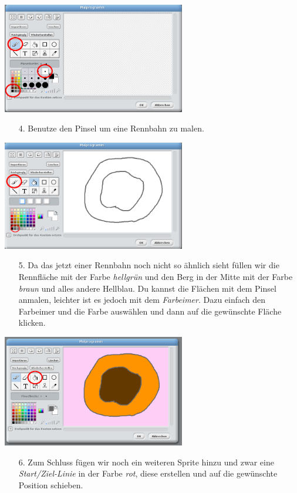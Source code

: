 \includegraphics[width=0.6\textwidth]{images/aufgabe4_rennbahn_pinsel_waehlen.png}
\begin{itemize}
\item[4. ] Benutze den Pinsel um eine Rennbahn zu malen.
\end{itemize}
\includegraphics[width=0.6\textwidth]{images/aufgabe4_rennbahn_malen_00.png}
\begin{itemize}
\item[5. ] Da das jetzt einer Rennbahn noch nicht so {\"a}hnlich sieht f{\"u}llen wir die Rennfl{\"a}che mit der Farbe \emph{hellgr{\"u}n} und den Berg in der Mitte mit der Farbe \emph{braun} und alles andere Hellblau. Du kannst die Fl{\"a}chen mit dem Pinsel anmalen, leichter ist es jedoch mit dem \emph{Farbeimer}. Dazu einfach den Farbeimer und die Farbe ausw{\"a}hlen und dann auf die gew{\"u}nschte Fl{\"a}che klicken.
\end{itemize}
\includegraphics[width=0.6\textwidth]{images/aufgabe4_rennbahn_malen_01.png}
\begin{itemize}
\item[6. ] Zum Schluss f{\"u}gen wir noch ein weiteren Sprite hinzu und zwar eine \emph{Start/Ziel-Linie} in der Farbe \emph{rot}, diese erstellen und auf die gew{\"u}nschte Position schieben.
\end{itemize}
